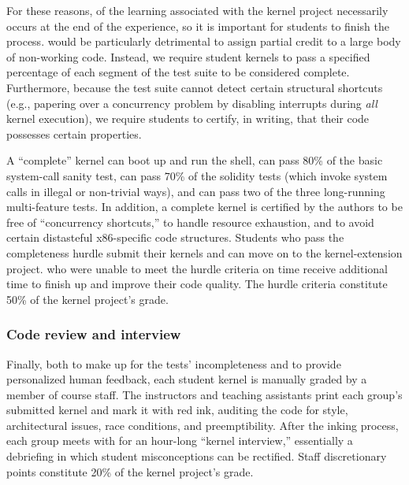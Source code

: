 For these reasons,  of the learning
associated with the kernel project necessarily occurs
at the end of the experience,
so it is important for students to finish the process.
 would be particularly detrimental to
assign partial credit to a large body of non-working
code.
Instead, we require student kernels to pass a
specified percentage of each segment of the test
suite to be considered complete.
Furthermore,
because the test suite cannot detect certain
structural shortcuts (e.g., papering over a concurrency
problem by disabling interrupts during \textit{all}
kernel execution),
we require students to certify, in writing, that
their code possesses certain properties.

A ``complete'' kernel can boot up and run the shell,
can pass 80\% of the basic system-call sanity test,
can pass 70\% of the solidity tests (which
invoke system calls in illegal or non-trivial ways),
and can pass two of the three long-running multi-feature tests.
In addition,
a complete kernel is certified by the authors to
be free of ``concurrency shortcuts,''
to handle resource exhaustion,
and to avoid certain distasteful x86-specific code structures.
%
Students who pass the completeness hurdle submit their kernels
and can move on to the kernel-extension project.
 who were unable to meet the
hurdle criteria on time receive additional time
to finish up and improve their code quality.
The hurdle criteria constitute 50\% of the kernel project's grade.

\subsubsection{Code review and interview}

Finally, both to make up for the tests' incompleteness and to provide personalized human feedback, each student kernel is manually graded by a member of course staff.
The instructors and teaching assistants print each group's submitted kernel and mark it with red ink, auditing the code for style, architectural issues, race conditions, and preemptibility.
After the inking process, each group meets with  for an hour-long ``kernel interview,'' essentially a debriefing in which student misconceptions can be rectified.
Staff discretionary points constitute 20\% of the kernel project's grade.
